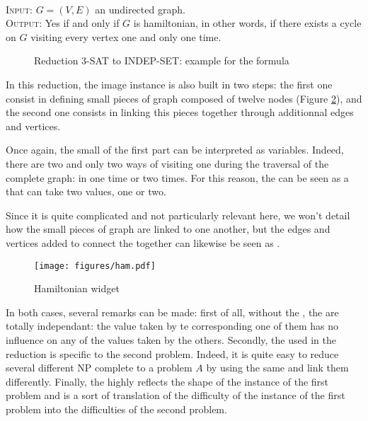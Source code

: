 \begin{definition} 
\ \\
  \textsc{Input:} $G=(V,E)$ an undirected graph.\\
  \textsc{Output:} Yes if and only if $G$ is hamiltonian, in other
  words, if there exists a cycle on $G$ visiting every vertex one and
  only one time.\\
\end{definition}

\begin{figure}
  \centering
  
  \caption{Reduction 3-SAT to INDEP-SET: example for the formula %
}
  \label{fig:3sat}
\end{figure}

In this reduction, the image instance is also built in two steps: the
first one consist in defining small pieces of graph composed of twelve
nodes (Figure \ref{fig:hamilton}), and the second one consists in
linking this pieces together through additionnal edges and
vertices. 

Once again, the small \widgets of the first part can be interpreted as
variables. Indeed, there are two and only two ways of visiting one
\widget during the traversal of the complete graph: in one time or two
times. For this reason, the \widget can be seen as a \variable that
can take two values, one or two.

Since it is quite complicated and not particularly relevant here, we
won't detail how the small pieces of graph are linked to one another,
but the edges and vertices added to connect the \widgets together can
likewise be seen as \constraints.

\begin{figure}
  \centering
  \texttt{[image: figures/ham.pdf]}

  \caption{Hamiltonian widget}
  \label{fig:hamilton}
\end{figure}

In both cases, several remarks can be made: first of all, without the
\constraints, the \widgets are totally independant: the value taken by
te \variable corresponding one of them has no influence on any of the
values taken by the others. Secondly, the \widget used in the
reduction is specific to the second problem. Indeed, it is quite easy
to reduce several different NP complete to a problem $A$ by using the
same \widgets and link them differently. Finally, the \constraints
highly reflects the shape of the instance of the first problem and is
a sort of translation of the difficulty of the instance of the first
problem into the difficulties of the second problem.

